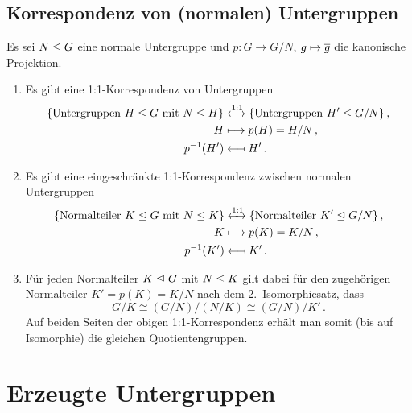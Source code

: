 \subsection{Korrespondenz von (normalen) Untergruppen}

\begin{proposition}
  Es sei $N \mathrel{\trianglelefteq} G$ eine normale Untergruppe und $p \colon G \to G/N$, $g \mapsto \overline{g}$ die kanonische Projektion.
  \begin{enumerate}
    \item
      Es gibt eine 1:1-Korrespondenz von Untergruppen
      \begin{align*}
        \{ \text{Untergruppen $H \mathrel{\leq} G$ mit $N \mathrel{\leq} H$} \}
        &\xleftrightarrow{1:1}
        \{ \text{Untergruppen $H' \mathrel{\leq} G/N$} \} \,,
        \\
        H
        &\longmapsto
        p(H)
        =
        H/N \,,
        \\
        p^{-1}(H')
        &\longmapsfrom
        H' \,.
      \end{align*}
    \item
      Es gibt eine eingeschränkte 1:1-Korrespondenz zwischen normalen Untergruppen
      \begin{align*}
        \{ \text{Normalteiler $K \mathrel{\trianglelefteq} G$ mit $N \mathrel{\leq} K$} \}
        &\xleftrightarrow{1:1}
        \{ \text{Normalteiler $K' \mathrel{\trianglelefteq} G/N$} \} \,,
        \\
        K
        &\longmapsto
        p(K)
        =
        K/N \,,
        \\
        p^{-1}(K')
        &\longmapsfrom
        K' \,.
      \end{align*}
    \item
      Für jeden Normalteiler $K \mathrel{\trianglelefteq} G$ mit $N \mathrel{\leq} K$ gilt dabei für den zugehörigen Normalteiler $K' = p(K) = K/N$ nach dem 2.\ Isomorphiesatz, dass
      \[
              G/K
        \cong (G/N)/(N/K)
        \cong (G/N)/K' \,.
      \]
      Auf beiden Seiten der obigen 1:1-Korrespondenz erhält man somit \textup(bis auf Isomorphie\textup) die gleichen Quotientengruppen.
  \end{enumerate}
\end{proposition}





\section{Erzeugte Untergruppen}



